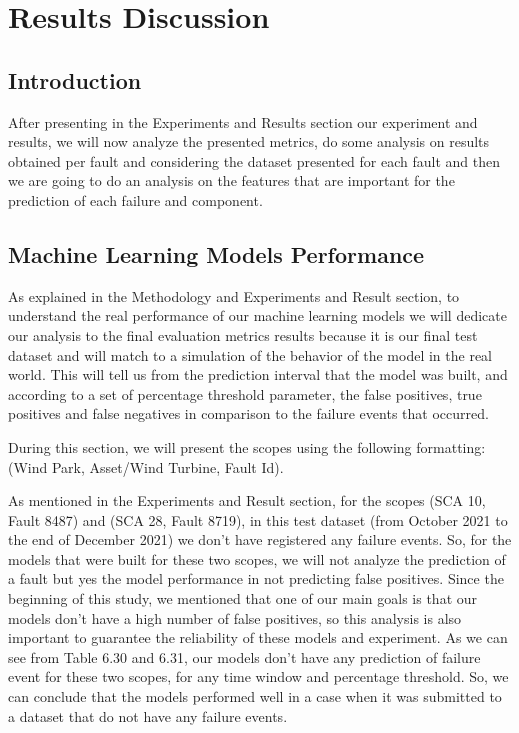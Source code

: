 

\chapter{Results Discussion}
\label{cha:Results Discussion}

\section{Introduction} 
\label{sub:Results Discussion/Introduction}
After presenting in the Experiments and Results section our experiment and results, we will now analyze the presented metrics, do some analysis on results obtained per fault and considering the dataset presented for each fault and then we are going to do an analysis on the features that are important for the prediction of each failure and component.

\section{Machine Learning Models Performance}
As explained in the Methodology and Experiments and Result section, to understand the real performance of our machine learning models we will dedicate our analysis to the final evaluation metrics results because it is our final test dataset and will match to a simulation of the behavior of the model in the real world. This will tell us from the prediction interval that the model was built, and according to a set of percentage threshold parameter, the false positives, true positives and false negatives in comparison to the failure events that occurred.

During this section, we will present the scopes using the following formatting: (Wind Park, Asset/Wind Turbine, Fault Id).

As mentioned in the Experiments and Result section, for the scopes (SCA 10, Fault 8487) and (SCA 28, Fault 8719), in this test dataset (from October 2021 to the end of December 2021) we don't have registered any failure events. So, for the models that were built for these two scopes, we will not analyze the prediction of a fault but yes the model performance in not predicting false positives. Since the beginning of this study, we mentioned that one of our main goals is that our models don't have a high number of false positives, so this analysis is also important to guarantee the reliability of these models and experiment. As we can see from Table 6.30 and 6.31, our models don't have any prediction of failure event for these two scopes, for any time window and percentage threshold. So, we can conclude that the models performed well in a case when it was submitted to a dataset that do not have any failure events.

